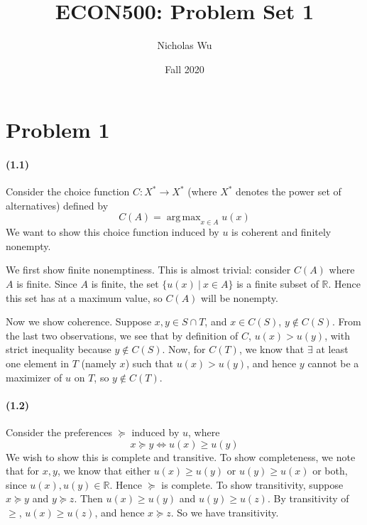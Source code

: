 \documentclass[10pt,letter]{article}
\DeclareMathOperator*{\argmax}{arg\,max}
\begin{document}


\title{ECON500: Problem Set 1}

\author{Nicholas Wu}

\date{Fall 2020}

\maketitle


\section*{Problem 1}

\paragraph{(1.1)} Consider the choice function $C: X^* \to X^*$ (where $X^*$ denotes the power set of alternatives) defined by
\[ C(A) = \argmax_{x \in A} u(x) \]
We want to show this choice function induced by $u$ is coherent and finitely nonempty.

We first show finite nonemptiness. This is almost trivial: consider $C(A)$ where $A$ is finite. Since $A$ is finite, the set $\{ u(x) \ | \ x \in A \}$ is a finite subset of $\mathbb{R}$. Hence this set has at a maximum value, so $C(A)$ will be nonempty.

Now we show coherence. Suppose $x, y \in S \cap T$, and $x \in C(S)$, $y \not\in C(S)$. From the last two observations, we see that by definition of $C$, $u(x) > u(y)$, with strict inequality because $y \not\in C(S)$. Now, for $C(T)$, we know that $\exists$ at least one element in $T$ (namely $x$) such that $u(x) > u(y)$, and hence $y$ cannot be a maximizer of $u$ on $T$, so $y \not \in C(T)$.

\paragraph{(1.2)} Consider the preferences $\succeq$ induced by $u$, where
\[ x \succeq y \iff u(x) \ge u(y)  \]
We wish to show this is complete and transitive. To show completeness, we note that for $x, y$, we know that either $u(x) \ge u(y)$ or $u(y) \ge u(x)$ or both, since $u(x), u(y) \in \mathbb{R}$. Hence $\succeq$ is complete. To show transitivity, suppose $x \succeq y$ and $y \succeq z$. Then $u(x) \ge u(y)$ and $u(y) \ge u(z)$. By transitivity of $\ge$, $u(x) \ge u(z)$, and hence $x \succeq z$. So we have transitivity.
\end{document}
